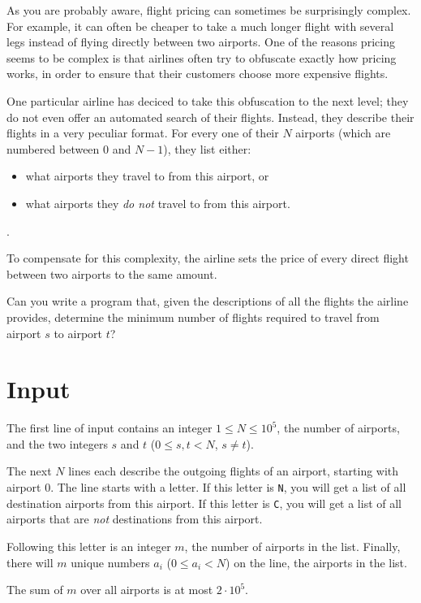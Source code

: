As you are probably aware, flight pricing can sometimes be surprisingly complex.
For example, it can often be cheaper to take a much longer flight with several legs instead of flying directly between two airports.
One of the reasons pricing seems to be complex is that airlines often try to obfuscate exactly how pricing works, in order to ensure that their customers choose more expensive flights.

One particular airline has deciced to take this obfuscation to the next level; they do not even offer an automated search of their flights.
Instead, they describe their flights in a very peculiar format.
For every one of their $N$ airports (which are numbered between $0$ and $N - 1$), they list either:
\begin{itemize}
    \item what airports they travel to from this airport, or
    \item what airports they \emph{do not} travel to from this airport.
\end{itemize}.

To compensate for this complexity, the airline sets the price of every direct flight between two airports to the same amount.

Can you write a program that, given the descriptions of all the flights the airline provides, determine the minimum number of flights required to travel from airport $s$ to airport $t$?

\section*{Input}
The first line of input contains an integer $1 \le N \le 10^5$, the number of airports, and the two integers $s$ and $t$ ($0 \le s, t < N$, $s \neq t$).

The next $N$ lines each describe the outgoing flights of an airport, starting with airport $0$.
The line starts with a letter.
If this letter is \texttt{N}, you will get a list of all destination airports from this airport.
If this letter is \texttt{C}, you will get a list of all airports that are \emph{not} destinations from this airport.

Following this letter is an integer $m$, the number of airports in the list.
Finally, there will $m$ unique numbers $a_i$ ($0 \le a_i < N$) on the line, the airports in the list.

The sum of $m$ over all airports is at most $2 \cdot 10^5$.

